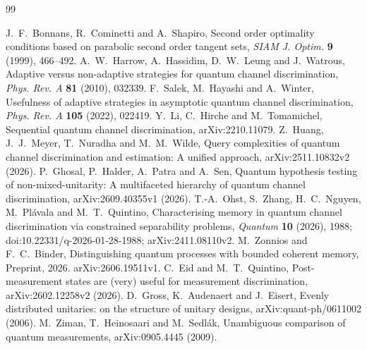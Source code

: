 \begin{thebibliography}{99}

 J.~F.~Bonnans, R.~Cominetti and A.~Shapiro,
Second order optimality conditions based on parabolic second order
tangent sets, \emph{SIAM J. Optim.} \textbf{9} (1999), 466--492.
 A.~W.~Harrow, A.~Hassidim, D.~W.~Leung and J.~Watrous,
Adaptive versus non-adaptive strategies for quantum channel
discrimination, \emph{Phys. Rev. A} \textbf{81} (2010), 032339.
 F.~Salek, M.~Hayashi and A.~Winter,
Usefulness of adaptive strategies in asymptotic quantum channel
discrimination, \emph{Phys. Rev. A} \textbf{105} (2022), 022419.
 Y.~Li, C.~Hirche and M.~Tomamichel,
Sequential quantum channel discrimination, arXiv:2210.11079.
 Z.~Huang, J.~J.~Meyer, T.~Nuradha and M.~M.~Wilde,
Query complexities of quantum channel discrimination and estimation:
A unified approach, arXiv:2511.10832v2 (2026).
 P.~Ghosal, P.~Halder, A.~Patra and A.~Sen,
Quantum hypothesis testing of non-mixed-unitarity: A multifaceted
hierarchy of quantum channel discrimination, arXiv:2609.40355v1 (2026).
 T.-A.~Ohst, S.~Zhang, H.~C.~Nguyen,
M.~Pl\'avala and M.~T.~Quintino,
Characterising memory in quantum channel discrimination via
constrained separability problems,
\emph{Quantum} \textbf{10} (2026), 1988;
doi:10.22331/q-2026-01-28-1988; arXiv:2411.08110v2.
 M.~Zonnios and F.~C.~Binder,
Distinguishing quantum processes with bounded coherent memory,
Preprint, 2026. arXiv:2606.19511v1.
 C.~Eid and M.~T.~Quintino,
Post-measurement states are (very) useful for measurement discrimination,
arXiv:2602.12258v2 (2026).
 D.~Gross, K.~Audenaert and J.~Eisert,
Evenly distributed unitaries: on the structure of unitary designs,
arXiv:quant-ph/0611002 (2006).
 M.~Ziman, T.~Heinosaari and M.~Sedl\'ak,
Unambiguous comparison of quantum measurements,
arXiv:0905.4445 (2009).
\end{thebibliography}
